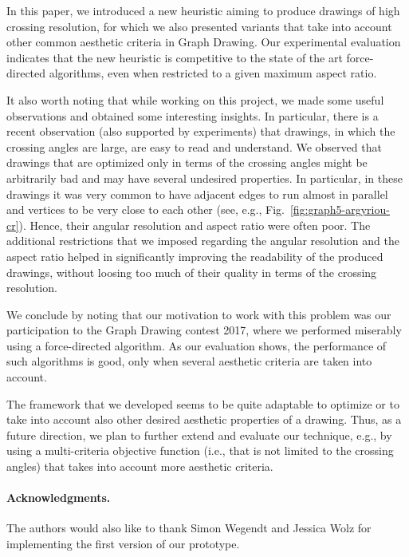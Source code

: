 \documentclass{comjnl}
\begin{document}
%
In this paper, we introduced a new heuristic aiming to produce drawings of high crossing resolution, for which we also presented variants that take into account other common aesthetic criteria in Graph Drawing. Our experimental evaluation indicates that the new heuristic is competitive to the state of the art force-directed algorithms, even when restricted to a given maximum aspect ratio. 

It also worth noting that while working on this project, we made some useful observations and obtained some interesting insights. In particular, there is a recent observation (also supported by experiments) that drawings, in which the crossing angles are large, are easy to read and understand. We observed that drawings that are optimized only in terms of the crossing angles might be arbitrarily bad and may have several undesired properties. In particular, in these drawings it was very common to have adjacent edges to run almost in parallel and vertices to be very close to each other (see, e.g., Fig.~\ref{fig:graph5-argyriou-cr}). Hence, their angular resolution and aspect ratio were often poor. The additional restrictions that we imposed regarding the angular resolution and the aspect ratio helped in significantly improving the readability of the produced drawings, without loosing too much of their quality in terms of the crossing resolution.

We conclude by noting that our motivation to work with this problem was our participation to the Graph Drawing contest 2017, where we performed miserably using a force-directed algorithm. As our evaluation shows, the performance of such algorithms is good, only when several aesthetic criteria are taken into account. 

The framework that we developed seems to be quite adaptable to optimize or to take into account also other desired aesthetic properties of a drawing. Thus, as a future direction, we plan to further extend and evaluate our technique, e.g., by using a multi-criteria objective function (i.e., that is not limited to the crossing angles) that takes into account more aesthetic criteria. 

\paragraph{Acknowledgments.} The authors would also like to thank Simon Wegendt and Jessica Wolz for implementing the first version of our prototype.



\end{document}
